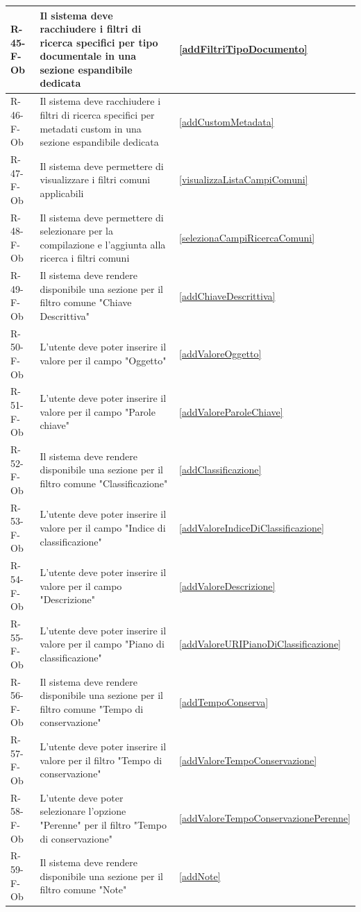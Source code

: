 \begin{longtable}{|p{2.5cm}|p{9.5cm}|p{2.5cm}|}
\hline
R-45-F-Ob & Il sistema deve racchiudere i filtri di ricerca specifici per tipo documentale in una sezione espandibile dedicata & \ref{addFiltriTipoDocumento} \\
\hline
R-46-F-Ob & Il sistema deve racchiudere i filtri di ricerca specifici per metadati custom in una sezione espandibile dedicata & \ref{addCustomMetadata} \\
\hline
R-47-F-Ob & Il sistema deve permettere di visualizzare i filtri comuni applicabili & \ref{visualizzaListaCampiComuni} \\
\hline
R-48-F-Ob & Il sistema deve permettere di selezionare per la compilazione e l'aggiunta alla ricerca i filtri comuni & \ref{selezionaCampiRicercaComuni} \\
\hline
R-49-F-Ob & Il sistema deve rendere disponibile una sezione per il filtro comune "Chiave Descrittiva" & \ref{addChiaveDescrittiva} \\
\hline
R-50-F-Ob & L'utente deve poter inserire il valore per il campo "Oggetto" & \ref{addValoreOggetto} \\
\hline
R-51-F-Ob & L'utente deve poter inserire il valore per il campo "Parole chiave" & \ref{addValoreParoleChiave} \\
\hline
R-52-F-Ob & Il sistema deve rendere disponibile una sezione per il filtro comune "Classificazione" & \ref{addClassificazione} \\
\hline
R-53-F-Ob & L'utente deve poter inserire il valore per il campo "Indice di classificazione" & \ref{addValoreIndiceDiClassificazione} \\
\hline
R-54-F-Ob & L'utente deve poter inserire il valore per il campo "Descrizione" & \ref{addValoreDescrizione} \\
\hline
R-55-F-Ob & L'utente deve poter inserire il valore per il campo "Piano di classificazione" & \ref{addValoreURIPianoDiClassificazione} \\
\hline
R-56-F-Ob & Il sistema deve rendere disponibile una sezione per il filtro comune "Tempo di conservazione" & \ref{addTempoConserva} \\
\hline
R-57-F-Ob & L'utente deve poter inserire il valore per il filtro "Tempo di conservazione" & \ref{addValoreTempoConservazione} \\
\hline
R-58-F-Ob & L'utente deve poter selezionare l'opzione "Perenne" per il filtro "Tempo di conservazione" & \ref{addValoreTempoConservazionePerenne} \\
\hline
R-59-F-Ob & Il sistema deve rendere disponibile una sezione per il filtro comune "Note" & \ref{addNote} \\

\end{longtable}
